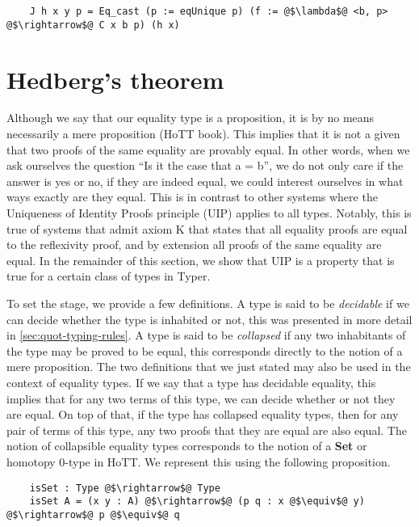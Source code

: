 \documentclass[12pt,twoside,maitrise]{dms}
\theoremstyle{definition}
\numberwithin{equation}{section}
\numberwithin{table}{chapter}
\numberwithin{figure}{chapter}
\begin{document}
\begin{verbatim}
    J h x y p = Eq_cast (p := eqUnique p) (f := @$\lambda$@ <b, p> @$\rightarrow$@ C x b p) (h x)
\end{verbatim}

\section{Hedberg's theorem}\label{subsec:hedberg}

Although we say that our equality type is a proposition, it is by no means
necessarily a mere proposition (HoTT book\cite[Chap~3.3]{HoTTbook}). This
implies that it is not a given that two proofs of the same equality are provably
equal\cite{hofmann1998groupoid}. In other words, when we ask ourselves the
question ``Is it the case that a = b'', we do not only care if the answer is yes
or no, if they are indeed equal, we could interest ourselves in what ways
exactly are they equal. This is in contrast to other systems where the
Uniqueness of Identity Proofs principle (UIP) applies to all types. Notably,
this is true of systems that admit axiom K\cite{streicher1993investigations}
that states that all equality proofs are equal to the reflexivity proof, and by
extension all proofs of the same equality are equal. In the remainder of this
section, we show that UIP is a property that is true for a certain class of
types in Typer.

To set the stage, we provide a few definitions. A type is said to be
\emph{decidable} if we can decide whether the type is inhabited or not, this was
presented in more detail in \autoref{sec:quot-typing-rules}. A type is said to
be \emph{collapsed} if any two inhabitants of the type may be proved to be
equal, this corresponds directly to the notion of a mere proposition. The two
definitions that we just stated may also be used in the context of equality
types. If we say that a type has decidable equality, this implies that for any
two terms of this type, we can decide whether or not they are equal. On top of
that, if the type has collapsed equality types, then for any pair of terms of
this type, any two proofs that they are equal are also equal. The notion of
collapsible equality types corresponds to the notion of a \textbf{Set} or
homotopy 0-type in HoTT\cite[Chap~3.1]{HoTTbook}. We represent this using the
following proposition.

\begin{verbatim}
    isSet : Type @$\rightarrow$@ Type
    isSet A = (x y : A) @$\rightarrow$@ (p q : x @$\equiv$@ y) @$\rightarrow$@ p @$\equiv$@ q
\end{verbatim}
\end{document}
